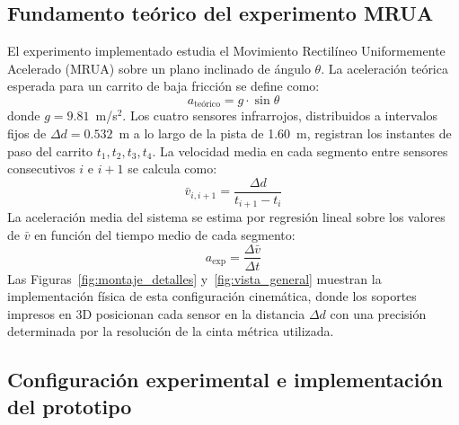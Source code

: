 \documentclass[journal,article,submit,pdftex]{Definitions/mdpi}
\begin{document}
\subsection{Fundamento te\'orico del experimento MRUA}

El experimento implementado estudia el Movimiento Rectil\'ineo Uniformemente Acelerado (MRUA) sobre un plano inclinado de \'angulo $\theta$. La aceleraci\'on te\'orica esperada para un carrito de baja fricci\'on se define como:
\begin{equation}
  a_{\text{te\'orico}} = g \cdot \sin\theta
  \label{eq:mruateorico}
\end{equation}
donde $g = 9.81$~m/s$^2$. Los cuatro sensores infrarrojos, distribuidos a intervalos fijos de $\Delta d = 0.532$~m a lo largo de la pista de 1.60~m, registran los instantes de paso del carrito $t_1, t_2, t_3, t_4$. La velocidad media en cada segmento entre sensores consecutivos $i$ e $i+1$ se calcula como:
\begin{equation}
  \bar{v}_{i,i+1} = \frac{\Delta d}{t_{i+1} - t_i}
  \label{eq:velocidad}
\end{equation}
La aceleraci\'on media del sistema se estima por regresi\'on lineal sobre los valores de $\bar{v}$ en funci\'on del tiempo medio de cada segmento:
\begin{equation}
  a_{\text{exp}} = \frac{\Delta \bar{v}}{\Delta t}
  \label{eq:aceleracion}
\end{equation}
Las Figuras~\ref{fig:montaje_detalles} y~\ref{fig:vista_general} muestran la implementaci\'on f\'isica de esta configuraci\'on cinem\'atica, donde los soportes impresos en 3D posicionan cada sensor en la distancia $\Delta d$ con una precisi\'on determinada por la resoluci\'on de la cinta m\'etrica utilizada.

\subsection{Configuración experimental e implementación del prototipo}
\end{document}
